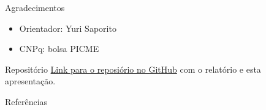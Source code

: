 \documentclass[13pt]{beamer}
\begin{document}

\begin{frame}{Agradecimentos}
    \begin{itemize}
        \item<1-> Orientador: Yuri Saporito
        \item<2-> CNPq: bolsa PICME
    \end{itemize}
\end{frame}

\begin{frame}{Repositório}
    \href{https://github.com/Caioflp/relatorio-ic}{Link para o reposiório no GitHub} com o relatório e esta apresentação.
\end{frame}


\begin{frame}[allowframebreaks]{Referências}
    \printbibliography[heading=bibintoc, title={Referências}]
\end{frame}
\end{document}
